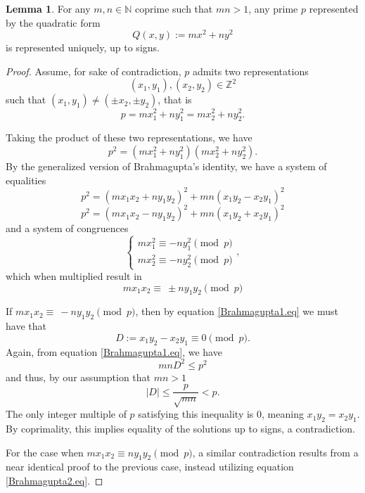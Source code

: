 \documentclass[11pt]{amsart}
\theoremstyle{definition}
\newtheorem{lemma}[theorem]{Lemma}
\begin{document}
\begin{lemma}\label{prime uniqueness}
For any $m,n\in\mathbb{N}$ coprime such that $mn>1$, any prime $p$ represented by the quadratic form
\[
Q(x,y):=mx^2+ny^2
\]
is represented uniquely, up to signs.
\end{lemma}
\begin{proof} Assume, for sake of contradiction, $p$ admits two representations 
\[
(x_1,y_1),(x_2,y_2) \in \mathbb{Z}^2
\]
such that $(x_1,y_1)\neq (\pm x_2,\pm y_2)$, that is 
\[
p=mx_1^2+ny_1^2=mx_2^2+ny_2^2.
\]

Taking the product of these two representations, we have
\[
p^2=(mx_1^2+ny_1^2)(mx_2^2+ny_2^2).
\]
By the generalized version of Brahmagupta's identity, we have a system of equalities
\begin{equation}\label{Brahmagupta1.eq}
    p^2=(mx_1x_2+ny_1y_2)^2+mn(x_1y_2-x_2y_1)^2
\end{equation}
\begin{equation}\label{Brahmagupta2.eq}
    p^2=(mx_1x_2-ny_1y_2)^2+mn(x_1y_2+x_2y_1)^2
\end{equation}
and a system of congruences 
\[\begin{cases}
    mx_1^2\equiv- ny_1^2 \pmod p\\
    mx_2^2\equiv- ny_2^2 \pmod p
\end{cases},\]
which when multiplied result in 
\[mx_1x_2\equiv\ \pm ny_1y_2 \pmod p\]

If $mx_1x_2\equiv\ - ny_1y_2 \pmod p$, then by equation \ref{Brahmagupta1.eq} we must have that 
\[
D:=x_1y_2-x_2y_1\equiv 0 \pmod p.
\]
Again, from equation \ref{Brahmagupta1.eq}, we have
\[mnD^2\leq p^2\]
and thus, by our assumption that $mn>1$
\[|D|\leq\dfrac{p}{\sqrt{mn}}<p.\]
The only integer multiple of $p$ satisfying this inequality is $0$, meaning $x_1y_2=x_2y_1$. By coprimality, this implies equality of the solutions up to signs, a contradiction.

For the case when $mx_1x_2\equiv ny_1y_2\pmod p$, a similar contradiction results from a near identical proof to the previous case, instead utilizing equation \ref{Brahmagupta2.eq}.
\end{proof}
\end{document}

